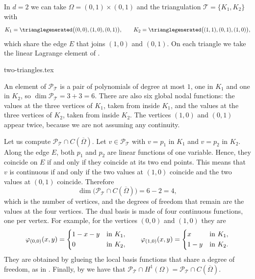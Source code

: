 \begin{example}
    \label{ex:finite-element space d=2}
    In $d = 2$ we can take $\Omega = (0,1) \times (0,1)$ and the triangulation $\mathcal T = \{K_1, K_2\}$ with
    \begin{equation*}
        K_1 = \trianglegenerated\big((0,0),(1,0),(0,1)\big),
        \qquad
        K_2 = \trianglegenerated\big((1,1),(0,1),(1,0)\big),
    \end{equation*}
    which share the edge $E$ that joins $(1,0)$ and $(0,1)$.
    On each triangle we take the linear Lagrange element of .
    \begin{center}
        {two-triangles.tex}
    \end{center}
    An element of $\mathcal P_{\mathcal T}$ is a pair of polynomials of degree at most $1$, one in $K_1$ and one in $K_2$, so $\dim \mathcal P_{\mathcal T} = 3 + 3 = 6$.
    There are also six global nodal functions: the values at the three vertices of $K_1$, taken from inside $K_1$, and the values at the three vertices of $K_2$, taken from inside $K_2$.
    The vertices $(1,0)$ and $(0,1)$ appear twice, because we are not assuming any continuity.

    Let us compute $\mathcal P_{\mathcal T} \cap C(\overline \Omega)$.
    Let $v \in \mathcal P_{\mathcal T}$ with $v = p_1$ in $K_1$ and $v = p_2$ in $K_2$.
    Along the edge $E$, both $p_1$ and $p_2$ are linear functions of one variable.
    Hence, they coincide on $E$ if and only if they coincide at its two end points.
    This means that $v$ is continuous if and only if the two values at $(1,0)$ coincide and the two values at $(0,1)$ coincide.
    Therefore
    \begin{equation*}
        \dim \big( \mathcal P_{\mathcal T} \cap C(\overline \Omega) \big) = 6 - 2 = 4,
    \end{equation*}
    which is the number of vertices, and the degrees of freedom that remain are the values at the four vertices.
    The dual basis is made of four continuous functions, one per vertex. For example, for the vertices $(0,0)$ and $(1,0)$ they are
    \begin{equation*}
        \varphi_{(0,0)} (x,y) = \begin{dcases}
            1 - x - y & \text{in } K_1, \\
            0         & \text{in } K_2,
        \end{dcases}
        \qquad
        \varphi_{(1,0)} (x,y) = \begin{dcases}
            x     & \text{in } K_1, \\
            1 - y & \text{in } K_2.
        \end{dcases}
    \end{equation*}
    They are obtained by glueing the local basis functions that share a degree of freedom, as in .
    Finally, by  we have that $\mathcal P_{\mathcal T} \cap H^1(\Omega) = \mathcal P_{\mathcal T} \cap C(\overline \Omega)$.
\end{example}

